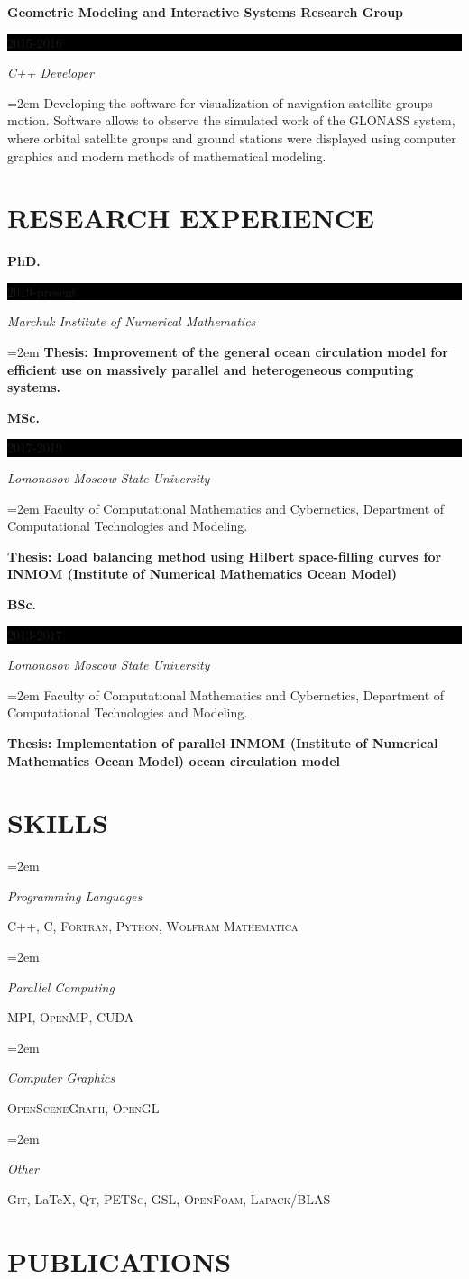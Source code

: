 \documentclass[paper=a4,fontsize=11pt]{scrartcl}
\newlength{\spacebox}
\newcommand{\sepspace}{\vspace*{1em}}		%
\newcommand{\NewPart}[1]{\section*{\uppercase{#1}}}
\newcommand{\PersonalEntry}[2]{
		\noindent\hangindent=2em\hangafter=0 %
		\parbox{\spacebox}{        %
		\textit{#1}}		       %
		\hspace{1.5em} #2 \par}    %
\newcommand{\SkillsEntry}[2]{      %
		\noindent\hangindent=2em\hangafter=0 %
		\parbox{\spacebox}{        %
		\textit{#1}}			   %
		\hspace{1.5em} #2 \par}    %
\newcommand{\EducationEntry}[4]{
		\noindent \textbf{#1} \hfill      %
		\colorbox{Black}{%
			\parbox{6em}{%
			\hfill\color{White}#2}} \par  %
		\noindent \textit{#3} \par        %
		\noindent\hangindent=2em\hangafter=0 \small #4 %
		\normalsize \par}
\begin{document}
\EducationEntry{Geometric Modeling and Interactive Systems Research Group}{2015-2016}{C++ Developer}
{Developing the software for visualization of navigation satellite groups motion.
Software allows to observe the simulated work of the GLONASS system, 
where orbital satellite groups and ground stations were displayed 
using computer graphics and modern methods of mathematical modeling.}

\NewPart{Research experience}{}

\EducationEntry{PhD.}{2019-present}{Marchuk Institute of Numerical Mathematics}
{{\bf Thesis: Improvement of the general ocean circulation model for efficient use on massively parallel and heterogeneous computing systems.}}
\sepspace

\EducationEntry{MSc.}{2017-2019}{Lomonosov Moscow State University}
{Faculty of Computational Mathematics and Cybernetics, 
Department of Computational Technologies and Modeling.

{\bf Thesis: Load balancing method using Hilbert space-filling curves for INMOM
(Institute of Numerical Mathematics Ocean Model)}}
\sepspace

\EducationEntry{BSc.}{2013-2017}{Lomonosov Moscow State University}
{Faculty of Computational Mathematics and Cybernetics, 
Department of Computational Technologies and Modeling.

{\bf Thesis: Implementation of parallel INMOM (Institute of Numerical Mathematics Ocean Model) ocean circulation model}}

\NewPart{Skills}{}

\SkillsEntry{Programming Languages}{\textsc{C++}, \textsc{C}, \textsc{Fortran}, \textsc{Python}, \textsc{Wolfram Mathematica}}
\sepspace

\SkillsEntry{Parallel Computing}{\textsc{MPI}, \textsc{OpenMP}, \textsc{CUDA}}
\sepspace

\SkillsEntry{Computer Graphics}{\textsc{OpenSceneGraph}, \textsc{OpenGL}}
\sepspace

\SkillsEntry{Other}{\textsc{Git}, \LaTeX, \textsc{Qt}, \textsc{PETSc}, \textsc{GSL}, \textsc{OpenFoam}, \textsc{Lapack/BLAS}}

\NewPart{Publications}{}
\end{document}
